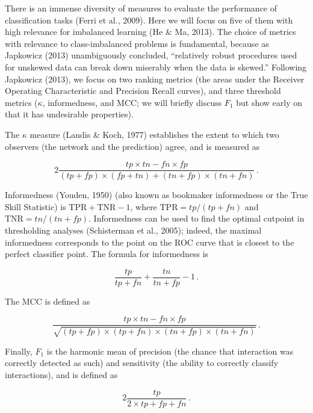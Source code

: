 \documentclass[11pt]{article}
\begin{document}
There is an immense diversity of measures to evaluate the performance of
classification tasks (Ferri et al., 2009). Here we will focus on five of
them with high relevance for imbalanced learning (He \& Ma, 2013). The
choice of metrics with relevance to class-imbalanced problems is
fundamental, because as Japkowicz (2013) unambiguously concluded,
``relatively robust procedures used for unskewed data can break down
miserably when the data is skewed.'' Following Japkowicz (2013), we
focus on two ranking metrics (the areas under the Receiver Operating
Characteristic and Precision Recall curves), and three threshold metrics
(\(\kappa\), informedness, and MCC; we will briefly discuss \(F_1\) but
show early on that it has undesirable properties).

The \(\kappa\) measure (Landis \& Koch, 1977) establishes the extent to
which two observers (the network and the prediction) agree, and is
measured as

\[
2\frac{tp\times tn - fn\times fp}{(tp+fp)\times (fp+tn)+(tn+fp)\times (tn+fn)} \,.
\]

Informedness (Youden, 1950) (also known as bookmaker informedness or the
True Skill Statistic) is \(\text{TPR}+\text{TNR}-1\), where
\(\text{TPR}= tp/(tp+fn)\) and \(\text{TNR} = tn/(tn+fp)\). Informedness
can be used to find the optimal cutpoint in thresholding analyses
(Schisterman et al., 2005); indeed, the maximal informedness corresponds
to the point on the ROC curve that is closest to the perfect classifier
point. The formula for informedness is

\[\frac{tp}{tp+fn}+\frac{tn}{tn+fp}-1\,.\]

The MCC is defined as

\[
\frac{tp\times tn - fn\times fp}{\sqrt{(tp+fp)\times (tp+fn)\times (tn+fp)\times (tn+fn)}} \,.
\]

Finally, \(F_1\) is the harmonic mean of precision (the chance that
interaction was correctly detected as such) and sensitivity (the ability
to correctly classify interactions), and is defined as

\[
2\frac{tp}{2\times tp + fp + fn}\,.
\]
\end{document}
